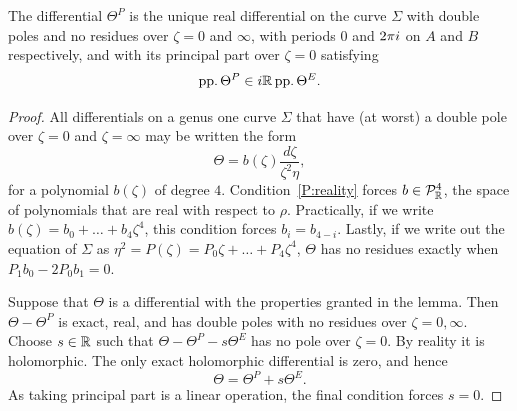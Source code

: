 \documentclass{article}
\begin{document}
\begin{lem}
\label{lem:theta2_characterisation}
The differential $\Theta^P$ is the unique real differential on the curve $\Sigma$ with double poles and no residues over $\zeta=0$ and $\infty$, with periods $0$ and $2\pi i$ on $A$ and $B$ respectively, and with its principal part over $\zeta=0$ satisfying
\[
\operatorname{pp.} \Theta^P \in i \mathbb{R} \operatorname{pp.} \Theta^E.
\]
\begin{proof}
All differentials on a genus one curve $\Sigma$ that have (at worst) a double pole over $\zeta=0$ and $\zeta=\infty$ may be written the form
\[
\Theta = b(\zeta)\frac{d\zeta}{\zeta^2\eta},
\]
for a polynomial $b(\zeta)$ of degree $4$. Condition~\ref{P:reality} forces $b\in \mathcal{P}^4_{\mathbb{R}}$, the space of polynomials that are real with respect to $\rho$. Practically, if we write $b(\zeta) = b_0 + \dots + b_4 \zeta^4$, this condition forces $b_i = b_{4-i}$. Lastly, if we write out the equation of $\Sigma$ as $\eta^2 = P(\zeta) = P_0 \zeta + \dots + P_4 \zeta^4$, $\Theta$ has no residues exactly when $P_1b_0 - 2P_0b_1 = 0$. 

Suppose that $\Theta$ is a differential with the properties granted in the lemma. Then $\Theta-\Theta^P$ is exact, real, and has double poles with no residues over $\zeta = 0,\infty$. Choose $s\in\mathbb{R}$ such that $\Theta-\Theta^P - s\Theta^E$ has no pole over $\zeta = 0$. By reality it is holomorphic. The only exact holomorphic differential is zero, and hence
\[
\Theta = \Theta^P + s \Theta^E.
\]
As taking principal part is a linear operation, the final condition forces $s=0$.
\end{proof}
\end{lem}
\end{document}
